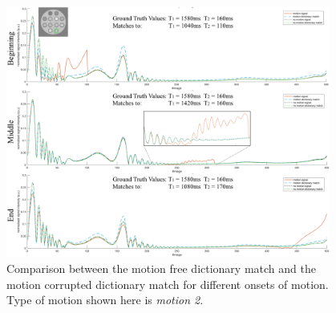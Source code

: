 \begin{figure}[ht]
    \centering
    \includegraphics[width=0.95\textwidth]{images/mrf/motion2ROIsignals}
    \caption{Comparison between the motion free dictionary match and the motion corrupted dictionary match for different onsets of motion. Type of motion shown here is \textit{motion 2}.}
    \label{fig:motion2ROIsignals}
\end{figure}
